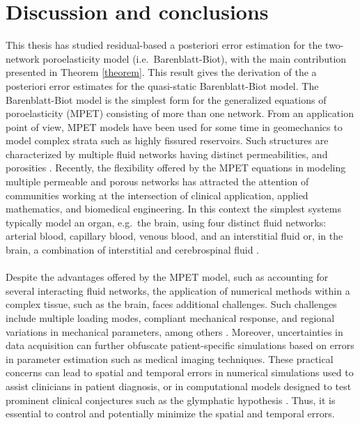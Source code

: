 \chapter{Discussion and conclusions}
\label{chap:discussion}
This thesis has studied residual-based a posteriori error estimation for the two-network poroelasticity model (i.e.~Barenblatt-Biot), with the main contribution presented in Theorem \ref{theorem}. This result gives the derivation of the a posteriori error estimates for the quasi-static Barenblatt-Biot model. The Barenblatt-Biot model is the simplest form for the generalized equations of poroelasticity (MPET) consisting of more than one network. From an application point of view, MPET models have been used for some time in geomechanics to model complex strata such as highly fissured reservoirs. Such structures are characterized by multiple fluid networks having distinct permeabilities, and porosities \cite{bai,Barenblatt1960,Barenblatt1963,Aifantis1982,Aifantis1984}. Recently, the flexibility offered by the MPET equations in modeling multiple permeable and porous networks has attracted the attention of communities working at the intersection of clinical application, applied mathematics, and biomedical engineering. In this context the simplest systems typically model an organ, e.g.~the brain, using four distinct fluid networks: arterial blood, capillary blood, venous blood, and an interstitial fluid or, in the brain, a combination of interstitial and cerebrospinal fluid \cite{vardakis}. 
\\
\\
Despite the advantages offered by the MPET model, such as accounting for several interacting fluid networks, the application of numerical methods within a complex tissue, such as the brain, faces additional challenges. Such challenges include multiple loading modes, compliant mechanical response, and regional variations in mechanical parameters, among others \cite{goriely}. Moreover, uncertainties in data acquisition can further obfuscate patient-specific simulations based on errors in parameter estimation such as medical imaging techniques. These practical concerns can lead to spatial and temporal errors in numerical simulations used to assist clinicians in patient diagnosis, or in computational models designed to test prominent clinical conjectures such as the glymphatic hypothesis \cite{iliff}. Thus, it is essential to control and potentially minimize the spatial and temporal errors.  
\\
\\

